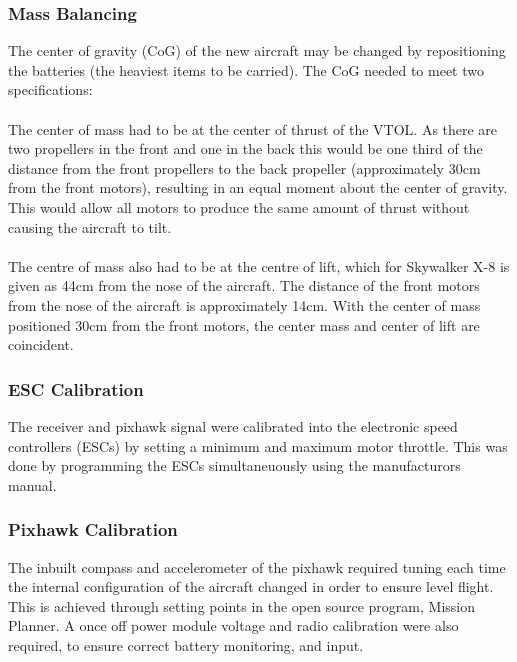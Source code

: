 \subsubsection*{Mass Balancing}
The center of gravity (CoG) of the new aircraft may be changed by repositioning the batteries (the heaviest items to be carried). The CoG needed to meet two specifications:
	\\\\The center of mass had to be at the center of thrust of the VTOL. As there are two propellers in the front and one in the back this would be one third of the distance from the front propellers to the back propeller (approximately 30cm from the front motors), resulting in an equal moment about the center of gravity. This would allow all motors to produce the same amount of thrust without causing the aircraft to tilt.
	\\\\The centre of mass also had to be at the centre of lift, which for Skywalker X-8 is given as 44cm from the nose of the aircraft. The distance of the front motors from the nose of the aircraft is approximately 14cm. With the center of mass positioned 30cm from the front motors, the center mass and center of lift are coincident.
\subsubsection*{ESC Calibration}
The receiver and pixhawk signal were calibrated into the electronic speed controllers (ESCs) by setting a minimum and maximum motor throttle. This was done by programming the ESCs simultaneuously using the manufacturors manual.

\subsubsection*{Pixhawk Calibration}
The inbuilt compass and accelerometer of the pixhawk required tuning each time the internal configuration of the aircraft changed in order to ensure level flight. This is achieved through setting points in the open source program, Mission Planner. A once off power module voltage and radio calibration were also required, to ensure correct battery monitoring, and input. 

